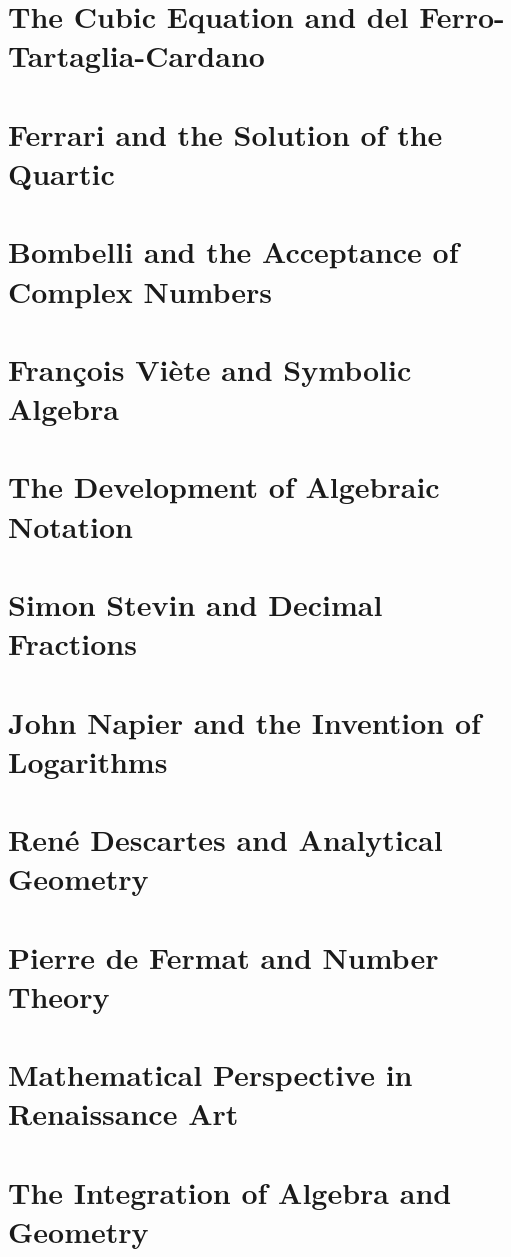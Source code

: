 \chapter{The Cubic Equation and del Ferro-Tartaglia-Cardano  }
\chapter{Ferrari and the Solution of the Quartic  }
\chapter{Bombelli and the Acceptance of Complex Numbers  }
\chapter{François Viète and Symbolic Algebra  }
\chapter{The Development of Algebraic Notation  }
\chapter{Simon Stevin and Decimal Fractions  }
\chapter{John Napier and the Invention of Logarithms  }
\chapter{René Descartes and Analytical Geometry  }
\chapter {Pierre de Fermat and Number Theory  }
\chapter {Mathematical Perspective in Renaissance Art  }
\chapter {The Integration of Algebra and Geometry}
